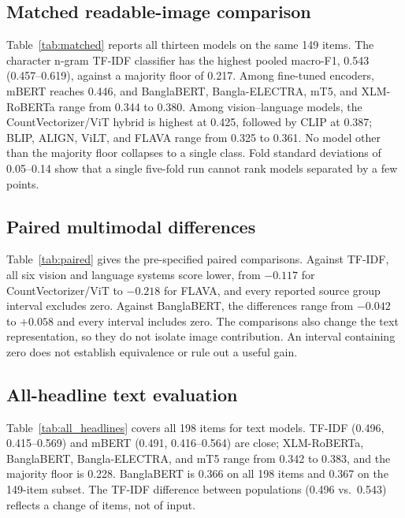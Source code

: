 \documentclass[11pt]{article}
\begin{document}
\subsection{Matched readable-image comparison}
Table~\ref{tab:matched} reports all thirteen models on the same 149 items. %
The character n-gram TF-IDF classifier has the highest pooled macro-F1, 0.543 (0.457--0.619), against a majority floor of 0.217. Among fine-tuned encoders, mBERT reaches 0.446, and BanglaBERT, Bangla-ELECTRA, mT5, and XLM-RoBERTa range from 0.344 to 0.380. Among vision--language models, the CountVectorizer/ViT hybrid is highest at 0.425, followed by CLIP at 0.387; BLIP, ALIGN, ViLT, and FLAVA range from 0.325 to 0.361. No model other than the majority floor collapses to a single class. Fold standard deviations of 0.05--0.14 show that a single five-fold run cannot rank models separated by a few points.

\subsection{Paired multimodal differences}
Table~\ref{tab:paired} gives the pre-specified paired comparisons. %
Against TF-IDF, all six vision and language systems score lower, from $-0.117$ for CountVectorizer/ViT to $-0.218$ for FLAVA, and every reported source group interval excludes zero. Against BanglaBERT, the differences range from $-0.042$ to $+0.058$ and every interval includes zero. The comparisons also change the text representation, so they do not isolate image contribution. An interval containing zero does not establish equivalence or rule out a useful gain. %

\subsection{All-headline text evaluation}
Table~\ref{tab:all_headlines} covers all 198 items for text models. %
TF-IDF (0.496, 0.415--0.569) and mBERT (0.491, 0.416--0.564) are close; XLM-RoBERTa, BanglaBERT, Bangla-ELECTRA, and mT5 range from 0.342 to 0.383, and the majority floor is 0.228. BanglaBERT is 0.366 on all 198 items and 0.367 on the 149-item subset. The TF-IDF difference between populations (0.496 vs.\ 0.543) reflects a change of items, not of input.
\end{document}
